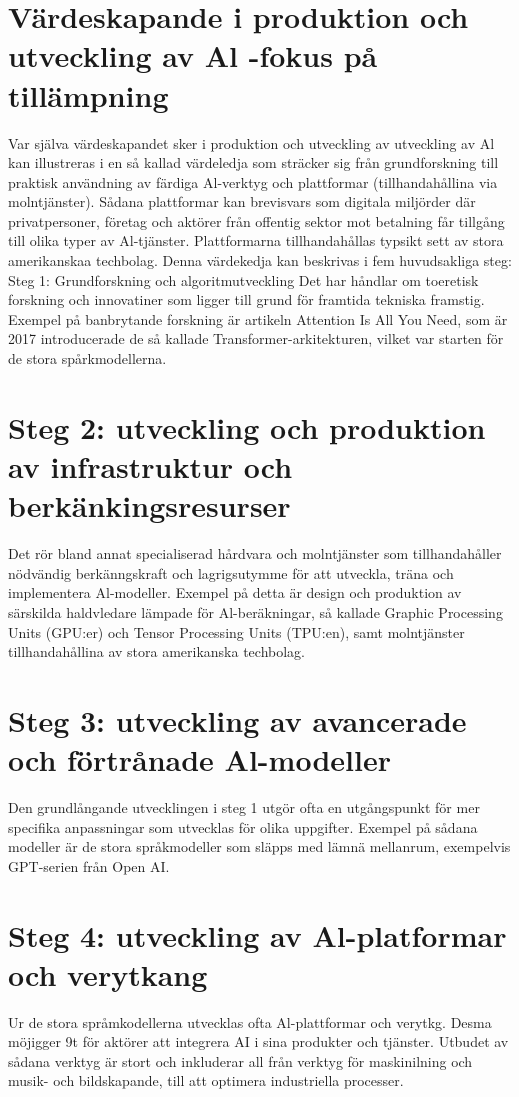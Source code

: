 {{{{{{{{\section*{Värdeskapande i produktion och utveckling av Al -fokus på tillämpning}
Var själva värdeskapandet sker i produktion och utveckling av utveckling av Al kan illustreras i en så kallad värdeledja som sträcker sig från grundforskning till praktisk användning av färdiga Al-verktyg och plattformar (tillhandahållina via molntjänster). Sådana plattformar kan brevisvars som digitala miljörder där privatpersoner, företag och aktörer från offentig sektor mot betalning får tillgång till olika typer av Al-tjänster. Plattformarna tillhandahållas typsikt sett av stora amerikanskaa techbolag. Denna värdekedja kan beskrivas i fem huvudsakliga steg:
Steg 1: Grundforskning och algoritmutveckling Det har håndlar om toeretisk forskning och innovatiner som ligger till grund för framtida tekniska framstig. Exempel på banbrytande forskning är artikeln Attention Is All You Need, som är 2017 introducerade de så kallade Transformer-arkitekturen, vilket var starten för de stora spårkmodellerna. \({ }^{}\)
\section*{Steg 2: utveckling och produktion av infrastruktur och berkänkingsresurser}
Det rör bland annat specialiserad hårdvara och molntjänster som tillhandahåller nödvändig berkänngskraft och lagrigsutymme för att utveckla, träna och implementera Al-modeller. Exempel på detta är design och produktion av särskilda haldvledare lämpade för Al-beräkningar, så kallade Graphic Processing Units (GPU:er) och Tensor Processing Units (TPU:en), samt molntjänster tillhandahållina av stora amerikanska techbolag.
\section*{Steg 3: utveckling av avancerade och förtrånade Al-modeller}
Den grundlångande utvecklingen i steg 1 utgör ofta en utgångspunkt för mer specifika anpassningar som utvecklas för olika uppgifter. Exempel på sådana modeller är de stora språkmodeller som släpps med lämnä mellanrum, exempelvis GPT-serien från Open AI.
\section*{Steg 4: utveckling av Al-platformar och verytkang}
Ur de stora språmkodellerna utvecklas ofta Al-plattformar och verytkg. Desma möjigger 9t för aktörer att integrera AI i sina produkter och tjänster. Utbudet av sådana verktyg är stort och inkluderar all från verktyg för maskinilning och musik- och bildskapande, till att optimera industriella processer.

}}}}}}}}
